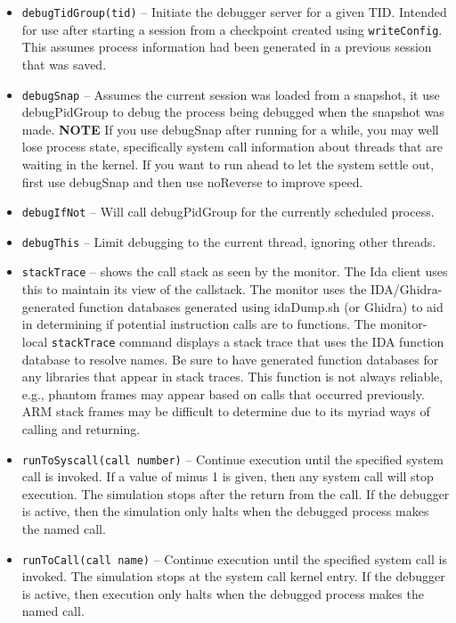 \documentclass[titlepage]{article}
\begin{document}
\begin{itemize}
\item {\tt debugTidGroup(tid)} -- Initiate the debugger server for a given TID.  Intended for use after starting a session from a checkpoint created using
{\tt writeConfig}.  This assumes process information had been generated in a previous session that was saved.  

\item {\tt debugSnap} -- Assumes the current session was loaded from a snapshot, it use debugPidGroup to debug the process being debugged when the snapshot was made.
\textbf{NOTE} If you use debugSnap after running for a while, you may well lose process state, specifically system call information about 
threads that are waiting in the kernel.  If you want to run ahead to let the system settle out, first use debugSnap and then use noReverse to improve speed.

\item {\tt debugIfNot} -- Will call debugPidGroup for the currently scheduled process.

\item {\tt debugThis} -- Limit debugging to the current thread, ignoring other threads.

\item {\tt stackTrace} – shows the call stack as seen by the monitor.  The Ida client uses this to maintain its view of the callstack.  The monitor
uses the IDA/Ghidra-generated function databases generated using idaDump.sh (or Ghidra) to aid in determining if 
potential instruction calls are to functions.  The monitor-local {\tt stackTrace} command displays a
stack trace that uses the IDA function database to resolve names.  Be sure to have generated function databases for any libraries that appear in stack traces.
This function is not always reliable, e.g., phantom frames may appear based on calls that occurred previously. ARM stack frames may be
difficult to determine due to its myriad ways of calling and returning.   

\item {\tt runToSyscall(call number)} – Continue execution until the specified system call is invoked.  If a value of minus 1 is given, then any system call will stop execution.  The simulation stops after the return from the call.  If the debugger is active, then the simulation only halts when the debugged process makes the named call.

\item {\tt runToCall(call name)} – Continue execution until the specified system call is invoked.  The simulation stops at the system call kernel entry.
If the debugger is active, then execution only halts when the debugged process makes the named call.


\end{itemize}
\end{document}
